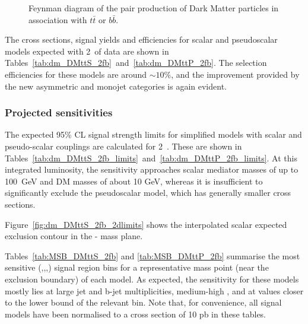 \begin{figure}[h!] \centering
{}
\caption{Feynman diagram of the pair production of Dark Matter particles in
association with $t\bar{t}$ or $b\bar{b}$. \cite{Abercrombie:2015wmb}}
\label{fig:feynman_hf} \end{figure}


The cross sections, signal yields and efficiencies for scalar and pseudoscalar
\DMtt models expected with 2~\ifb of data are shown in
Tables~\ref{tab:dm_DMttS_2fb}~and~\ref{tab:dm_DMttP_2fb}. The selection
efficiencies for these models are around $\sim 10$\%, and the improvement
provided by the new asymmetric and monojet categories is again evident.

\clearpage 

 
\clearpage


\subsubsection{Projected sensitivities}

The expected 95\% CL signal strength limits for simplified \DMtt models with scalar and
pseudo-scalar couplings are calculated for 2~\ifb. These are shown in
Tables~\ref{tab:dm_DMttS_2fb_limits}~and~\ref{tab:dm_DMttP_2fb_limits}. At this
integrated luminosity, the sensitivity approaches scalar mediator masses of up 
to 100~GeV and DM masses of about 10 GeV, whereas it is insufficient to
significantly exclude the pseudoscalar model, which has generally smaller cross
sections.

Figure~\ref{fig:dm_DMttS_2fb_2dlimits} shows the interpolated scalar expected 
exclusion contour in the {\mphi-\mchi} mass plane.

Tables~\ref{tab:MSB_DMttS_2fb} and \ref{tab:MSB_DMttP_2fb} summarise the most sensitive 
{(\njet,\nb,\scalht,\mht)} signal region
bins for a representative mass point (near the exclusion boundary) of each \DMtt
model. As expected, the sensitivity for these models mostly lies at large jet and b-jet
multiplicities, medium-high \scalht, and at \mht values closer to the lower bound
of the relevant \scalht bin. Note that, for convenience, all signal models have
been normalised to a cross section of 10 pb in these tables.


